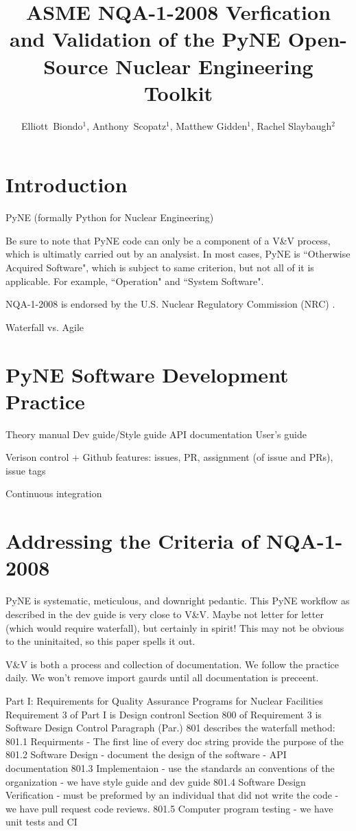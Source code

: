 \documentclass{anstrans}
\title{ASME NQA-1-2008 Verfication and Validation of the PyNE Open-Source Nuclear Engineering Toolkit}
\author{Elliott~Biondo$^{1}$, Anthony~Scopatz$^{1}$, Matthew Gidden$^{1}$, Rachel Slaybaugh$^{2}$}
\institute{
\and $^{1}$ The University of Wisconsin-Madison, 1415 Engineering Drive, Madison, WI 53706\\
\and $^{2}$ The University of California, Berkeley, 2521 Hearst Ave, Berkeley, CA 94709 \\
}
\begin{document}
\section{Introduction}

PyNE (formally Python for Nuclear Engineering)

Be sure to note that PyNE code can only be a component of a V\&V process, which
is ultimatly carried out by an analysist. In most cases, PyNE is ``Otherwise
Acquired Software", which is subject to same criterion, but not all of it is
applicable. For example, ``Operation" and ``System Software".

NQA-1-2008 \cite{nqa} is endorsed by the U.S. Nuclear Regulatory Commission (NRC) \cite{nrc}.

Waterfall vs. Agile


\section{PyNE Software Development Practice}

Theory manual
Dev guide/Style guide
API documentation
User's guide

Verison control + Github features: issues, PR, assignment (of issue and PRs), issue tags

Continuous integration



\section{Addressing the Criteria of NQA-1-2008}

PyNE is systematic, meticulous, and downright pedantic.
This PyNE workflow as described in the dev guide is very close to V\&V. Maybe not letter for letter (which would require waterfall), but certainly in spirit! 
This may not be obvious to the uninitaited, so this paper spells it out.

V\&V is both a process and collection of documentation. We follow the practice daily. We won't remove import gaurds until all documentation is preceent.

Part I: Requirements for Quality Assurance Programs for Nuclear Facilities
Requirement 3 of Part I is Design contronl
Section 800 of Requirement 3 is Software Design Control 
Paragraph (Par.) 801 describes the waterfall method:
801.1 Requirments - The first line of every doc string provide the purpose of the 
801.2 Software Design - document the design of the software - API documentation
801.3 Implementaion - use the standards an conventions of the organization - we have style guide and dev guide
801.4 Software Design Verification - must be preformed by an individual that did not write the code  - we have pull request code reviews.
801.5 Computer program testing - we have unit tests and CI
\end{document}

